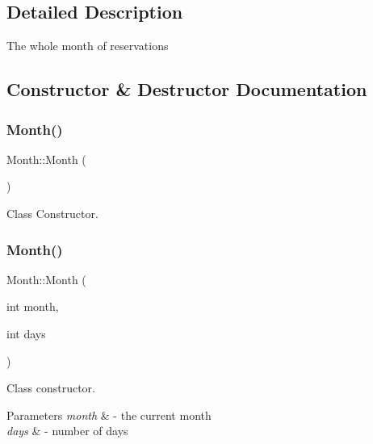 \subsection{Detailed Description}
The whole month of reservations 

\subsection{Constructor \& Destructor Documentation}
\mbox{\label{class_month_a36882c55ece9c4210ec1b01bd665ec89}} 
\subsubsection{\texorpdfstring{Month()}{Month()}\hspace{0.1cm}{\footnotesize\ttfamily [1/2]}}
{\footnotesize\ttfamily Month\+::\+Month (\begin{DoxyParamCaption}{ }\end{DoxyParamCaption})\hspace{0.3cm}{\ttfamily [inline]}}



Class Constructor. 

\mbox{\label{class_month_a4abb71ddcd1dfed172a828d8598bbdc7}} 
\subsubsection{\texorpdfstring{Month()}{Month()}\hspace{0.1cm}{\footnotesize\ttfamily [2/2]}}
{\footnotesize\ttfamily Month\+::\+Month (\begin{DoxyParamCaption}\item[{int}]{month,  }\item[{int}]{days }\end{DoxyParamCaption})}



Class constructor. 


\begin{DoxyParams}{Parameters}
{\em month} & -\/ the current month \\
\hline
{\em days} & -\/ number of days \\
\hline
\end{DoxyParams}


